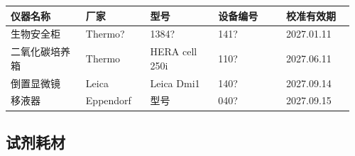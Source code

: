 \documentclass[UTF8,10pt,a4paper,fontset=fandol]{ctexart}
\newcommand{\fieldvalue}[1]{#1}
\newcommand{\handwritten}[1]{#1}
\begin{document}
\begin{tabular}{|p{0.21\linewidth}|p{0.18\linewidth}|p{0.19\linewidth}|p{0.19\linewidth}|p{0.19\linewidth}|}
\hline
仪器名称 & 厂家 & 型号 & 设备编号 & 校准有效期\\
\hline
生物安全柜 &
\fieldvalue{\handwritten{Thermo?}} &
\fieldvalue{\handwritten{1384?}} &
\fieldvalue{\handwritten{141?}} &
\fieldvalue{\handwritten{2027.01.11}}\\
\hline
二氧化碳培养箱 &
\fieldvalue{Thermo} &
\fieldvalue{HERA cell 250i} &
\fieldvalue{\handwritten{110?}} &
\fieldvalue{\handwritten{2027.06.11}}\\
\hline
倒置显微镜 &
\fieldvalue{Leica} &
\fieldvalue{Leica Dmi1} &
\fieldvalue{\handwritten{140?}} &
\fieldvalue{\handwritten{2027.09.14}}\\
\hline
移液器 &
\fieldvalue{Eppendorf} &
型号 &
\fieldvalue{\handwritten{040?}} &
\fieldvalue{\handwritten{2027.09.15}}\\
\hline
\end{tabular}

\subsection{试剂耗材}
\end{document}
